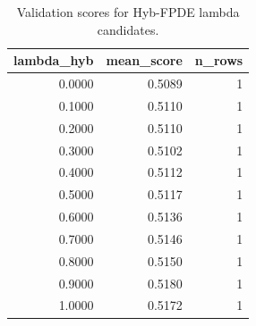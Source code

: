 \begin{table}[t]
\caption{Validation scores for Hyb-FPDE lambda candidates.}
\label{tab:lambda_distribution_computed}
\centering
\begin{tabular}{rrr}
\toprule
lambda\_hyb & mean\_score & n\_rows \\
\midrule
0.0000 & 0.5089 & 1 \\
0.1000 & 0.5110 & 1 \\
0.2000 & 0.5110 & 1 \\
0.3000 & 0.5102 & 1 \\
0.4000 & 0.5112 & 1 \\
0.5000 & 0.5117 & 1 \\
0.6000 & 0.5136 & 1 \\
0.7000 & 0.5146 & 1 \\
0.8000 & 0.5150 & 1 \\
0.9000 & 0.5180 & 1 \\
1.0000 & 0.5172 & 1 \\
\bottomrule
\end{tabular}

\end{table}
